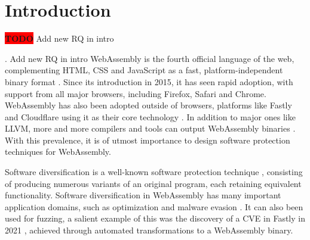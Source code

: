 \documentclass[a4paper,fleqn]{cas-dc}
\newcommand*\badge[1]{ \colorbox{red}{\color{white}#1}}
\newcommand{\Wasm}{WebAssembly\xspace}
\newcommand{\wasm}{\Wasm}
\newcommand{\todo}[1]{%
\refstepcounter{todo}
\noindent\textbf{\badge{TODO}} {\color{red}#1}
\addcontentsline{td}{todo}
{\color{red}\thesection.\thetodo\xspace #1}}
\begin{document}



\maketitle


\section{Introduction}

\todo{Add new RQ in intro}
\Wasm is the fourth official language of the web, complementing HTML, CSS and JavaScript as a fast, platform-independent binary format  \cite{haas2017bringing, WebAssemblyCoreSpecification}. 
Since its introduction in 2015, it has seen rapid adoption, with support from all major browsers, including Firefox, Safari and Chrome. 
\wasm has also been adopted outside of browsers, platforms like Fastly and Cloudflare using it as their core technology \cite{fastly}.
In addition to major ones like LLVM, more and more compilers and tools can output \wasm binaries \cite{hilbig2021empirical, javy, kmm}. With this prevalence, it is of utmost importance to design software protection techniques for \wasm \cite{avengers}.

Software diversification is a well-known software protection technique \cite{cohen1993operating, 4197960, 595185}, consisting of producing numerous variants of an original program, each retaining equivalent functionality. 
Software diversification in \wasm has many important application domains, such as optimization \cite{superwasm} and malware evasion \cite{CABRERAARTEAGA2023103296}. 
It can also been used for fuzzing, a salient example of this was the discovery of a CVE in Fastly in 2021 \cite{CVE}, achieved through automated transformations to a \wasm binary.
\end{document}

